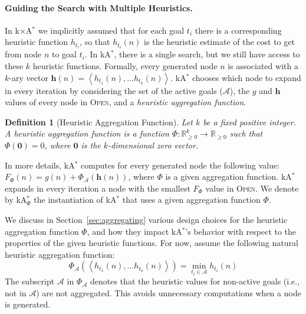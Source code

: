 \documentclass[twoside,11pt]{article}
\newtheorem{definition}[theorem]{Definition}
\newcommand{\astar}{A$^*$\xspace}
\newcommand{\kastar}{kA$^*$\xspace}
\newcommand{\kastarphi}{\textup{kA}$^*_{\Phi}$\xspace}
\newcommand{\kxastar}{k$\times$A$^*$\xspace}
\newcommand{\tuple}[1]{\ensuremath{\left \langle #1 \right \rangle }}
\newcommand{\open}{\textsc{Open}\xspace}
\newcommand{\activeg}{\mathcal{A}}
\newcommand{\vect}[1]{\mathbf{#1}}
\newcommand{\nonnegreals}{\mathbb{R}_{\geq 0}}
\begin{document}
\paragraph{Guiding the Search with Multiple Heuristics.}
In \kxastar we implicitly assumed that for each goal $t_i$ there is a corresponding heuristic function $h_{t_i}$, so that $h_{t_i}(n)$ is the heuristic estimate of the cost to get from node $n$ to goal $t_i$. 
In \kastar, there is a single search, but we still have access to these $k$ heuristic functions. Formally, every generated node $n$ is associated with a $k$-ary vector $\vect{h}(n) = \tuple{h_{t_1}(n), \ldots h_{t_k}(n)}$. \kastar chooses which node to expand in every iteration by considering the set of the active goals ($\activeg$),  
the $g$ and $\vect{h}$ values of every node in \open, 
and a \emph{heuristic aggregation function}. 
\begin{definition}[Heuristic Aggregation Function]
	Let $k$ be a fixed positive integer.
	A \emph{heuristic aggregation function} is a function $\Phi: \nonnegreals^k \rightarrow \nonnegreals$ such that $\Phi(\vect{0}) = 0$, where $\vect{0}$ is the $k$-dimensional zero vector.
	\label{def:aggregation}
\end{definition}
In more details, \kastar computes for every generated node the following value: $F_\Phi(n) = g(n) + \Phi_{\activeg}(\vect{h}(n))$, 
where $\Phi$ is a given aggregation function. 
\kastar expands in every iteration a node with the smallest $F_\Phi$ value in \open. We denote by \kastarphi the instantiation of \kastar that uses a given aggregation function $\Phi$. 


We discuss in Section~\ref{sec:aggregating} various design choices for  the heuristic aggregation function $\Phi$, and how they impact \kastar's behavior with respect to the properties of the given heuristic functions. 
For now, assume the following natural heuristic aggregation function: 
\begin{equation}
\Phi_{\activeg}(\tuple{h_{t_1}(n), \dots h_{t_k}(n)}) = \min_{t_i\in\activeg} h_{t_i}(n) 
\label{eq:basic-phi-min}
\end{equation} 
The subscript $\activeg$ in $\Phi_\activeg$ denotes that the heuristic values for non-active goals (i.e., not in $\activeg$) are not aggregated. This avoids  unnecessary computations when a node is generated. 
 
\end{document}
